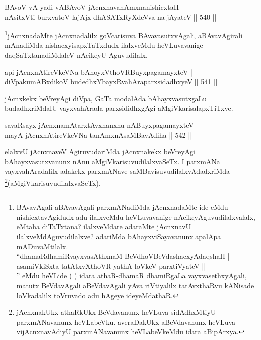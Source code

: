 
\begin{shl}
BAvoV vA yadi vA\s BAvoV jAcnxnavanAmxnanishicxtaH | \\
nAsitxVti burxvatoV lajAjx dhASATxRyXdeVva na jAyateV \hfill||  540 ||  
\end{shl}

\begin{artha}
\footnote{BAvavAgali aBAvavAgali parxmANadiMda jAcnxnadaMte ide eMdu nishicxtavAgidudx adu ilalxveMdu heVLuvavanige nAcikeyAguvudilalxvalalx, eMtaha diTaTxtana? ilalxveMdare adaraMte jAcnxnavU ilalxveMdAguvudilalxve? adariMda bAhayxviSayavanunx apalApa mADuvaMtilalx. \\``dhamaRdhamiRvayxvasAthxnaM BeVdhoV\s BeVdashacxyAdaqshaH |\\
asamiVkiSxta tatAtxvXthoVR yathA loVkeV parxtiVyateV ||\\'' eMdu heVLide ( ) idara athaR-dhamaR dhamiRgaLa vayxvasethxyAgali, matutx BeVdavAgali aBeVdavAgali yAva riVtiyalilx tatAvxthaRvu kANisade loVkadalilx toVruvado adu hAgeye ideyeMdathaR.}jAcnxnadaMte jAcnxnadalilx goVcarisuva BAvavasutxvAgali, aBAvavAgirali mAnadiMda nishacxyisapxTaTxdudx ilalxveMdu heVLuvavanige daqSaTxtanadiMdaleV nAcikeyU Aguvudilalx.
\end{artha}

\begin{shl}
api jAcnxnAtireVkeVNa bAhoyxV\s thoVR\s BuyxpagamayxteV | \\
diVpakumABxdikoV budedhxYbayxRvahAraparxsidadhxyeV \hfill||  541 ||  
\end{shl}

\begin{artha}
jAcnxkekx beVreyAgi diVpa, GaTa modalAda bAhayxvasutxgaLu budadhxriMdalU vayxvahArada parxsididhxgAgi aMgiVkarisalapxTiTxve. 
\end{artha}


\begin{shl}
savaRsayx jAcnxnamAtarxtAvxnanxnu nABuyxpagamayxteV | \\
mayA jAcnxnAtireVkeVNa tanAmxnAsaMBavAdiha \hfill||  542 ||  
\end{shl}

\begin{artha}
elalxvU jAcnxnaveV AgiruvudariMda jAcnxnakekx beVreyAgi bAhayxvasutxvanunx nAnu aMgiVkarisuvudilalxvaSeTx. I parxmANa vayxvahAradalilx adakekx parxmANave saMBavisuvudilalxvAdadxriMda \footnote{jAcnxnakUkx athaRkUkx BeVdavanunx heVLuva sidAdhxMtiyU parxmANavanunx heVLabeVku. averaDakUkx aBeVdavanunx heVLuva vijAcnxnavAdiyU parxmANavanunx heVLabeVkeMdu idara aBipArxya.}(aMgiVkarisuvudilalxvaSeTx).
\end{artha}

